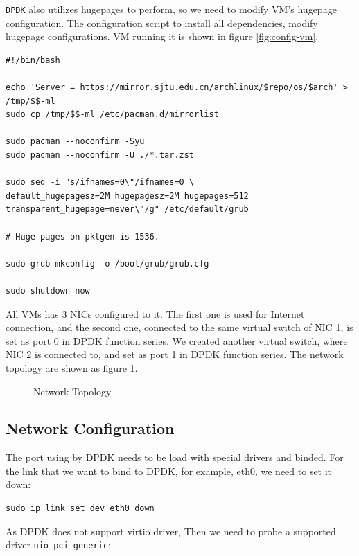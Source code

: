 \documentclass[12pt]{article}
\begin{document}
\texttt{DPDK} also utilizes hugepages to perform, so we need to modify VM's hugepage configuration. The configuration script to install all dependencies, modify hugepage configurations. VM running it is shown in figure \ref{fig:config-vm}.


\begin{lstlisting}[caption={Contents of \texttt{configure\_hugepage.sh}}]
#!/bin/bash

echo 'Server = https://mirror.sjtu.edu.cn/archlinux/$repo/os/$arch' > /tmp/$$-ml
sudo cp /tmp/$$-ml /etc/pacman.d/mirrorlist

sudo pacman --noconfirm -Syu
sudo pacman --noconfirm -U ./*.tar.zst

sudo sed -i "s/ifnames=0\"/ifnames=0 \
default_hugepagesz=2M hugepagesz=2M hugepages=512  transparent_hugepage=never\"/g" /etc/default/grub

# Huge pages on pktgen is 1536.

sudo grub-mkconfig -o /boot/grub/grub.cfg

sudo shutdown now
\end{lstlisting}

All VMs has 3 NICs configured to it. The first one is used for Internet connection, and the second one, connected to the same virtual switch of NIC 1, is set as port 0 in DPDK function series. We created another virtual switch, where NIC 2 is connected to, and set as port 1 in DPDK function series. The network topology are shown as figure \ref{fig:net_topo}.

\begin{figure}[ht]
    \centering
    \def\svgwidth{0.3\textwidth}
    \tiny
    
    \caption{Network Topology}
    \label{fig:net_topo}
\end{figure}

\subsection{Network Configuration}

The port using by DPDK needs to be load with special drivers and binded. For the link that we want to bind to DPDK, for example, eth0, we need to set it down:

\begin{lstlisting}
sudo ip link set dev eth0 down
\end{lstlisting}

As DPDK does not support virtio driver, Then we need to probe a supported driver \texttt{uio\_pci\_generic}:
\end{document}
